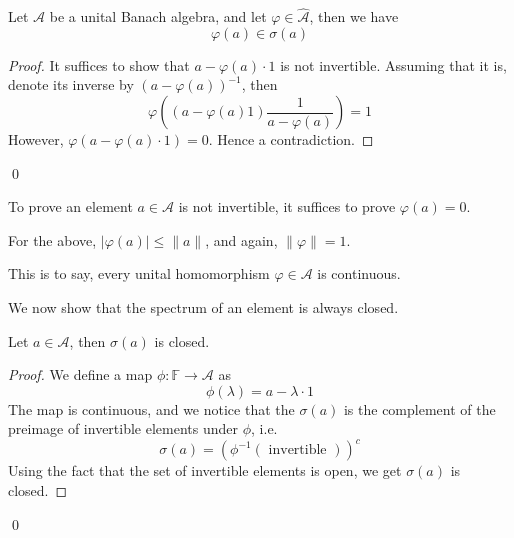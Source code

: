 \begin{proposition}
    Let $\mathcal{A}$ be a unital Banach algebra, and let $\varphi\in\widehat{\mathcal{A}}$, then we have
    \begin{equation*}
        \varphi(a)\in\sigma(a)
    \end{equation*}
\end{proposition}
\begin{proof}
    It suffices to show that $a-\varphi(a)\cdot 1$ is not invertible. Assuming that it is, denote its inverse by $(a-\varphi(a))^{-1}$, then
    \begin{equation*}
        \varphi\left((a-\varphi(a)1)\frac{1}{a-\varphi(a)}\right)=1
    \end{equation*}
    However, $\varphi(a-\varphi(a)\cdot 1)=0$. Hence a contradiction.
\end{proof}
\qed

\begin{remark}
    To prove an element $a\in\mathcal{A}$ is not invertible, it suffices to prove $\varphi(a)=0$.
\end{remark}

\begin{corollary}
    For the above, $|\varphi(a)|\leq\|a\|$, and again, $\|\varphi\|=1$.
\end{corollary}
\begin{remark}
    This is to say, every unital homomorphism  $\varphi\in\mathcal{A}$ is continuous.
\end{remark}

We now show that the spectrum of an element is always closed.
\begin{proposition}
    Let $a\in\mathcal{A}$, then $\sigma(a)$ is closed.
\end{proposition}
\begin{proof}
    We define a map $\phi:\mathbb{F}\to\mathcal{A}$ as 
    \begin{equation*}
        \phi(\lambda)=a-\lambda\cdot 1
    \end{equation*}
    The map is continuous, and we notice that the $\sigma(a)$ is the complement of the preimage of invertible elements under $\phi$, i.e.
    \begin{equation*}
        \sigma(a)=(\phi^{-1}(\text{ invertible }))^c
    \end{equation*}
    Using the fact that the set of invertible elements is open, we get $\sigma(a)$ is closed.
\end{proof}
\qed

